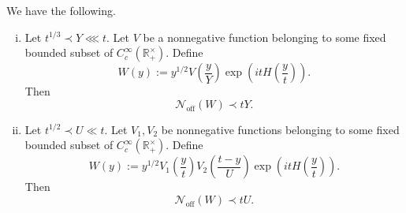 \documentclass[reqno]{amsart} 
\begin{document}
\begin{proposition}\label{proposition:reduction-to-key-parts-of-W}
  We have the following.
  \begin{enumerate}[(i)]
  \item Let $t ^{1/3} \prec Y \lll t$.  Let $V$ be a nonnegative function belonging to some fixed bounded subset of $C_c^\infty(\mathbb{R}^\times_+)$.  Define
    \begin{equation*}
      W(y) := y^{1/2} V \left( \frac{y}{Y} \right) \exp \left( i t H \left( \frac{y}{t} \right) \right).
    \end{equation*}
    Then
    \begin{equation*}
      \mathcal{N}_{\mathrm{off}} (W) \prec  t Y.
    \end{equation*}
    \item Let $t ^{1/2} \prec U \ll t$.  Let $V_1, V_2$ be nonnegative functions belonging to some fixed bounded subset of $C_c^\infty(\mathbb{R}^\times_+)$.  Define
    \begin{equation*}
      W(y) :=
      y^{1/2}
      V_1 \left( \frac{y}{t} \right)
      V_2 \left( \frac{t - y}{U} \right)
      \exp \left( i t H \left( \frac{y}{t} \right) \right).
    \end{equation*}
  Then
  \begin{equation*}
    \mathcal{N}_{\mathrm{off}} (W) \prec t U.
  \end{equation*}
  \end{enumerate}
\end{proposition}
\end{document}

